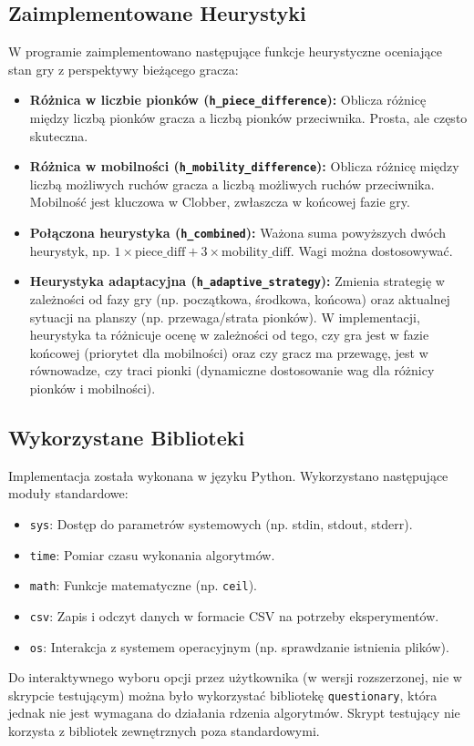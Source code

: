 \documentclass[11pt,a4paper]{article}
\newcommand{\code}[1]{\texttt{#1}} %
\begin{document}
\subsection{Zaimplementowane Heurystyki}
W programie zaimplementowano następujące funkcje heurystyczne oceniające stan gry z perspektywy bieżącego gracza:
\begin{itemize}
    \item \textbf{Różnica w liczbie pionków (\code{h\_piece\_difference}):} Oblicza różnicę między liczbą pionków gracza a liczbą pionków przeciwnika. Prosta, ale często skuteczna.
    \item \textbf{Różnica w mobilności (\code{h\_mobility\_difference}):} Oblicza różnicę między liczbą możliwych ruchów gracza a liczbą możliwych ruchów przeciwnika. Mobilność jest kluczowa w Clobber, zwłaszcza w końcowej fazie gry.
    \item \textbf{Połączona heurystyka (\code{h\_combined}):} Ważona suma powyższych dwóch heurystyk, np. $1 \times \text{piece\_diff} + 3 \times \text{mobility\_diff}$. Wagi można dostosowywać.
    \item \textbf{Heurystyka adaptacyjna (\code{h\_adaptive\_strategy}):} Zmienia strategię w zależności od fazy gry (np. początkowa, środkowa, końcowa) oraz aktualnej sytuacji na planszy (np. przewaga/strata pionków). W implementacji, heurystyka ta różnicuje ocenę w zależności od tego, czy gra jest w fazie końcowej (priorytet dla mobilności) oraz czy gracz ma przewagę, jest w równowadze, czy traci pionki (dynamiczne dostosowanie wag dla różnicy pionków i mobilności).
\end{itemize}

\subsection{Wykorzystane Biblioteki}
Implementacja została wykonana w języku Python. Wykorzystano następujące moduły standardowe:
\begin{itemize}
    \item \code{sys}: Dostęp do parametrów systemowych (np. stdin, stdout, stderr).
    \item \code{time}: Pomiar czasu wykonania algorytmów.
    \item \code{math}: Funkcje matematyczne (np. \code{ceil}).
    \item \code{csv}: Zapis i odczyt danych w formacie CSV na potrzeby eksperymentów.
    \item \code{os}: Interakcja z systemem operacyjnym (np. sprawdzanie istnienia plików).
\end{itemize}
Do interaktywnego wyboru opcji przez użytkownika (w wersji rozszerzonej, nie w skrypcie testującym) można było wykorzystać bibliotekę \code{questionary}, która jednak nie jest wymagana do działania rdzenia algorytmów. Skrypt testujący nie korzysta z bibliotek zewnętrznych poza standardowymi.
\end{document}
